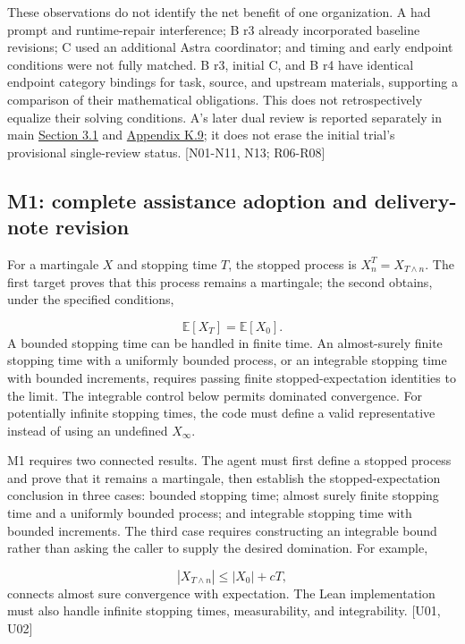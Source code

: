 These observations do not identify the net benefit of one organization. A had prompt and runtime-repair interference; B r3 already incorporated baseline revisions; C used an additional Astra coordinator; and timing and early endpoint conditions were not fully matched. B r3, initial C, and B r4 have identical endpoint category bindings for task, source, and upstream materials, supporting a comparison of their mathematical obligations. This does not retrospectively equalize their solving conditions. A's later dual review is reported separately in main \href{en.pdf\#section-3-1}{Section 3.1} and \hyperlink{k9}{Appendix K.9}; it does not erase the initial trial's provisional single-review status. [N01-N11, N13; R06-R08]

\subsection[M1: complete assistance adoption and delivery-note revision]{\texorpdfstring{\protect\hypertarget{g11}{}M1: complete assistance adoption and delivery-note revision}{M1: complete assistance adoption and delivery-note revision}}
For a martingale $X$ and stopping time $T$, the stopped process is $X^T_n=X_{T\wedge n}$. The first target proves that this process remains a martingale; the second obtains, under the specified conditions,

\[
\mathbb E[X_T]=\mathbb E[X_0].
\]
A bounded stopping time can be handled in finite time. An almost-surely finite stopping time with a uniformly bounded process, or an integrable stopping time with bounded increments, requires passing finite stopped-expectation identities to the limit. The integrable control below permits dominated convergence. For potentially infinite stopping times, the code must define a valid representative instead of using an undefined $X_\infty$.

M1 requires two connected results. The agent must first define a stopped process and prove that it remains a martingale, then establish the stopped-expectation conclusion in three cases: bounded stopping time; almost surely finite stopping time and a uniformly bounded process; and integrable stopping time with bounded increments. The third case requires constructing an integrable bound rather than asking the caller to supply the desired domination. For example,

\[
|X_{T\wedge n}|\leq |X_0|+cT,
\]
connects almost sure convergence with expectation. The Lean implementation must also handle infinite stopping times, measurability, and integrability. [U01, U02]

